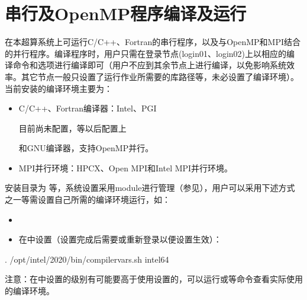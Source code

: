 \documentclass[a4paper,12pt,english]{sphinxmanual}
\begin{document}
\chapter{串行及OpenMP程序编译及运行}
\label{\detokenize{serial-compiling/serial-compiling:openmp}}\label{\detokenize{serial-compiling/serial-compiling::doc}}
\sphinxAtStartPar
在本超算系统上可运行C/C++、Fortran的串行程序，以及与OpenMP和MPI结合的并行程序。编译程序时，用户只需在登录节点(login01、login02)上以相应的编译命令和选项进行编译即可（用户不应到其余节点上进行编译，以免影响系统效率。其它节点一般只设置了运行作业所需要的库路径等，未必设置了编译环境）。当前安装的编译环境主要为：
\begin{itemize}
\item {} 
\sphinxAtStartPar
C/C++、Fortran编译器：Intel、PGI %
\begin{footnote}[1]\sphinxAtStartFootnote
目前尚未配置，等以后配置上
%
\end{footnote} 和GNU编译器，支持OpenMP并行。

\item {} 
\sphinxAtStartPar
MPI并行环境：HPC\sphinxhyphen{}X、Open MPI和Intel MPI并行环境。

\end{itemize}

\sphinxAtStartPar
安装目录为  等，系统设置采用module进行管理（参见），用户可以采用下述方式之一等需设置自己所需的编译环境运行，如：
\begin{itemize}
\item {} 
\sphinxAtStartPar
{}

\item {} 
\sphinxAtStartPar
在中设置（设置完成后需要或重新登录以便设置生效）：

\end{itemize}

\begin{sphinxVerbatim}[commandchars=\\\{\}]
. /opt/intel/2020/bin/compilervars.sh intel64
\end{sphinxVerbatim}

\sphinxAtStartPar
注意：在中设置的级别有可能要高于使用设置的，可以运行或等命令查看实际使用的编译环境。
\end{document}
